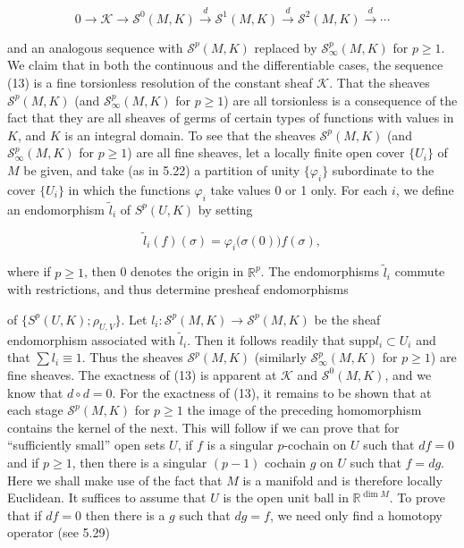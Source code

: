 \begin{equation}
\tag{13}\label{eq:5.31:13}
0\to\mathcal{K}\to\mathcal{S}^{0}(M,K)\xrightarrow{d}\mathcal{S}^{1}(M,K)\xrightarrow{d}\mathcal{S}^{2}(M,K)\xrightarrow{d}\cdots
\end{equation}

and an analogous sequence with $\mathcal{S}^{p}(M,K)$ replaced by $\mathcal{S}_{\infty}^{p}(M,K)$ for $p\geq1$. We claim that in both the continuous and the differentiable cases, the sequence (13) is a fine torsionless resolution of the constant sheaf $\mathcal{K}$. That the sheaves $\mathcal{S}^{p}(M,K)$ (and $\mathcal{S}_{\infty}^{p}(M,K)$ for $p\geq1$) are all torsionless is a consequence of the fact that they are all sheaves of germs of certain types of functions with values in $K$, and $K$ is an integral domain. To see that the sheaves $\mathcal{S}^{p}(M,K)$ (and $\mathcal{S}_{\infty}^{p}(M,K)$ for $p\geq1$) are all fine sheaves, let a locally finite open cover $\{U_{i}\}$ of $M$ be given, and take (as in 5.22) a partition of unity $\{\varphi_{i}\}$ subordinate to the cover $\{U_{i}\}$ in which the functions $\varphi_{i}$ take values 0 or 1 only. For each $i$, we define an endomorphism $\tilde{l}_{i}$ of $S^{p}(U,K)$ by setting

\begin{equation}
\tag{14}\label{eq:5.31:14}
\tilde{l}_{i}(f)(\sigma)=\varphi_{i}\big(\sigma(0)\big)f(\sigma),
\end{equation}

where if  $ p \geq 1 $, then 0 denotes the origin in  $ \mathbb{R}^p $. The endomorphisms  $ \tilde{l}_i $ commute with restrictions, and thus determine presheaf endomorphisms

of $\{S^p(U,K); \rho_{U,V}\}$. Let $l_i: \mathcal{S}^p(M,K) \to \mathcal{S}^p(M,K)$ be the sheaf endomorphism associated with $\tilde{l}_i$. Then it follows readily that $\text{supp} l_i \subset U_i$ and that $\sum l_i \equiv 1$. Thus the sheaves $\mathcal{S}^p(M,K)$ (similarly $\mathcal{S}_{\infty}^{p}(M,K)$ for $p \geq 1$) are fine sheaves. The exactness of (13) is apparent at $\mathcal{K}$ and $\mathcal{S}^{0}(M,K)$, and we know that $d \circ d = 0$. For the exactness of (13), it remains to be shown that at each stage $\mathcal{S}^p(M,K)$ for $p \geq 1$ the image of the preceding homomorphism contains the kernel of the next. This will follow if we can prove that for “sufficiently small” open sets $U$, if $f$ is a singular $p$-cochain on $U$ such that $df = 0$ and if $p \geq 1$, then there is a singular $(p-1)$ cochain $g$ on $U$ such that $f = dg$. Here we shall make use of the fact that $M$ is a manifold and is therefore locally Euclidean. It suffices to assume that $U$ is the open unit ball in $\mathbb{R}^{\dim M}$. To prove that if $df = 0$ then there is a $g$ such that $dg = f$, we need only find a homotopy operator (see 5.29)

